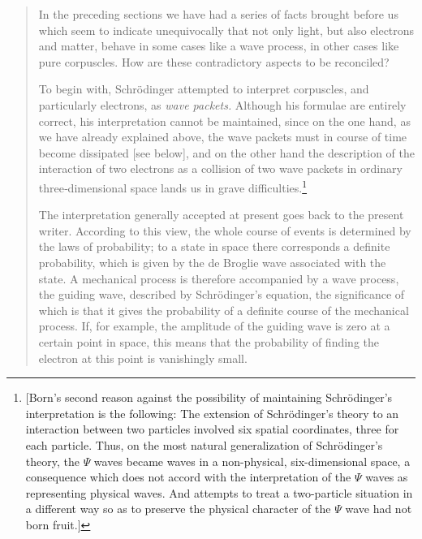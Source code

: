 \begin{quotation}
In the preceding sections we have had a series of facts brought before
us which seem to indicate unequivocally that not only light, but also
electrons and matter, behave in some cases like a wave process, in other
cases like pure corpuscles. How are these contradictory aspects to be
reconciled?

To begin with, Schrödinger attempted to interpret corpuscles, and
particularly electrons, as \emph{wave packets.} Al­though his formulae
are entirely correct, his interpretation cannot be main­tained, since on
the one hand, as we have already explained above, the wave packets must
in course of time become dissipated {[}see below{]}, and on the other
hand the description of the interaction of two electrons as a collision
of two wave packets in ordinary three‑dimensional space lands us in
grave difficulties.\footnote{{[}Born's second reason against the
  possibility of maintaining Schrödinger's interpretation is the
  following: The extension of Schrödinger's theory to an interaction
  between two particles involved six spatial coordinates, three for each
  particle. Thus, on the most natural generalization of Schrödinger's
  theory, the $\Psi$ waves became waves in a non-physical,
  six-dimensional space, a consequence which does not accord with the
  interpretation of the $\Psi$ waves as representing physical waves.
  And attempts to treat a two-particle situation in a different way so
  as to preserve the physical character of the $\Psi$ wave had not
  born fruit.{]}}

The interpretation generally accepted at present goes back to the
present writer. According to this view, the whole course of events is
determined by the laws of probability; to a state in space there
corresponds a definite probability, which is given by the de Broglie
wave associated with the state. A mechanical process is therefore
accompanied by a wave process, the guiding wave, described by
Schrödinger's equation, the significance of which is that it gives the
probability of a definite course of the me­chanical process. If, for
example, the amplitude of the guiding wave is zero at a certain point in
space, this means that the probability of finding the electron at this
point is vanishingly small.


\end{quotation}
